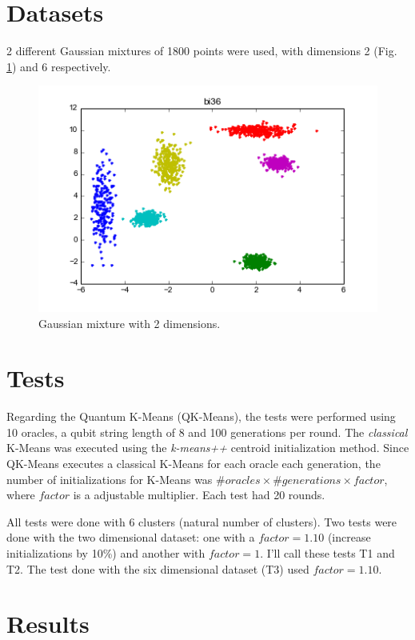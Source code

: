 \documentclass[12pt,a4paper,final]{article}
\author{Diogo Silva}
\begin{document}
\section{Datasets}
2 different Gaussian mixtures of 1800 points were used, with dimensions 2 (Fig. \ref{fig:mix}) and 6 respectively.

\begin{figure}[hbtp]

\centering
\includegraphics[scale=0.8]{figure.png}
\caption{Gaussian mixture with 2 dimensions.}
\label{fig:mix}
\end{figure}

\section{Tests}
Regarding the Quantum K-Means (QK-Means), the tests were performed using 10 oracles, a qubit string length of 8 and 100 generations per round. The \textit{classical} K-Means was executed using the \textit{k-means++} centroid initialization method. Since QK-Means executes a classical K-Means for each oracle each generation, the number of initializations for K-Means was $\#oracles \times \#generations \times factor$, where $factor$ is a adjustable multiplier. Each test had 20 rounds.

All tests were done with 6 clusters (natural number of clusters). Two tests were done with the two dimensional dataset: one with a $factor=1.10$ (increase initializations by 10\%) and another with $factor=1$. I'll call these tests T1 and T2. The test done with the six dimensional dataset (T3) used $factor=1.10$.

\section{Results}
\end{document}
